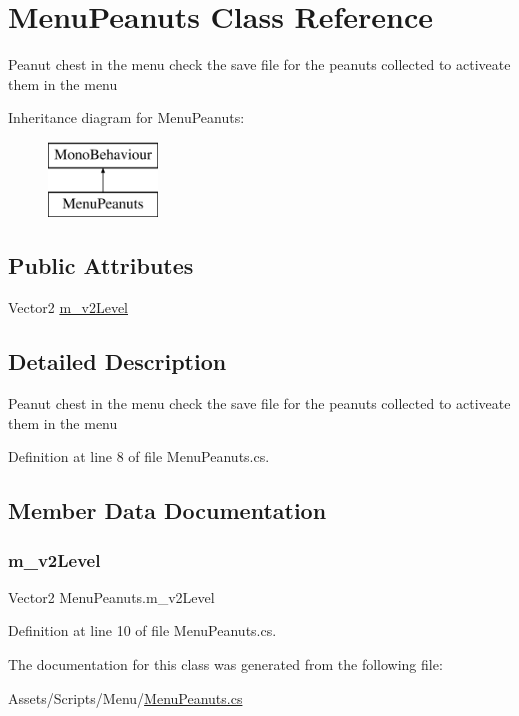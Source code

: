 \hypertarget{class_menu_peanuts}{}\section{Menu\+Peanuts Class Reference}
\label{class_menu_peanuts}


Peanut chest in the menu check the save file for the peanuts collected to activeate them in the menu  


Inheritance diagram for Menu\+Peanuts\+:\begin{figure}[H]
\begin{center}
\leavevmode
\includegraphics[height=2.000000cm]{class_menu_peanuts}
\end{center}
\end{figure}
\subsection*{Public Attributes}
\begin{DoxyCompactItemize}
\item 
Vector2 \mbox{\hyperlink{class_menu_peanuts_aeb0c1e8c3ea4c95483f5ffe56826e2c3}{m\+\_\+v2\+Level}}
\end{DoxyCompactItemize}


\subsection{Detailed Description}
Peanut chest in the menu check the save file for the peanuts collected to activeate them in the menu 



Definition at line 8 of file Menu\+Peanuts.\+cs.



\subsection{Member Data Documentation}
\mbox{\label{class_menu_peanuts_aeb0c1e8c3ea4c95483f5ffe56826e2c3}} 
\subsubsection{\texorpdfstring{m\+\_\+v2\+Level}{m\_v2Level}}
{\footnotesize\ttfamily Vector2 Menu\+Peanuts.\+m\+\_\+v2\+Level}



Definition at line 10 of file Menu\+Peanuts.\+cs.



The documentation for this class was generated from the following file\+:\begin{DoxyCompactItemize}
\item 
Assets/\+Scripts/\+Menu/\mbox{\hyperlink{_menu_peanuts_8cs}{Menu\+Peanuts.\+cs}}\end{DoxyCompactItemize}

